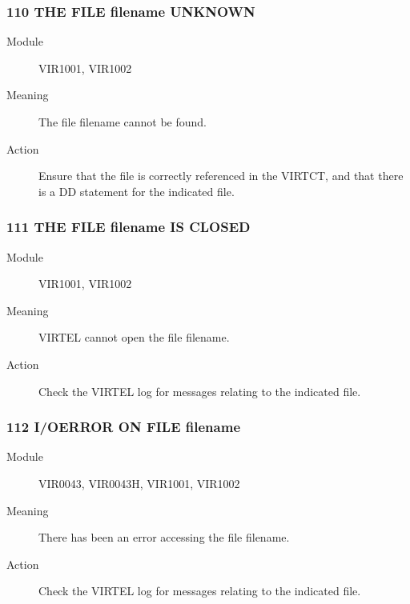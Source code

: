 \documentclass[letterpaper,10pt,english]{sphinxmanual}
\begin{document}
\subsubsection{110 THE FILE filename UNKNOWN}
\label{\detokenize{messages:the-file-filename-unknown}}\begin{description}
\item[{Module}] \leavevmode
VIR1001, VIR1002

\item[{Meaning}] \leavevmode
The file filename cannot be found.

\item[{Action}] \leavevmode
Ensure that the file is correctly referenced in the VIRTCT, and that there is a DD statement for the indicated file.

\end{description}


\subsubsection{111 THE FILE filename IS CLOSED}
\label{\detokenize{messages:the-file-filename-is-closed}}\begin{description}
\item[{Module}] \leavevmode
VIR1001, VIR1002

\item[{Meaning}] \leavevmode
VIRTEL cannot open the file filename.

\item[{Action}] \leavevmode
Check the VIRTEL log for messages relating to the indicated file.

\end{description}


\subsubsection{112 I/OERROR ON FILE filename}
\label{\detokenize{messages:i-oerror-on-file-filename}}\begin{description}
\item[{Module}] \leavevmode
VIR0043, VIR0043H, VIR1001, VIR1002

\item[{Meaning}] \leavevmode
There has been an error accessing the file filename.

\item[{Action}] \leavevmode
Check the VIRTEL log for messages relating to the indicated file.

\end{description}
\end{document}
